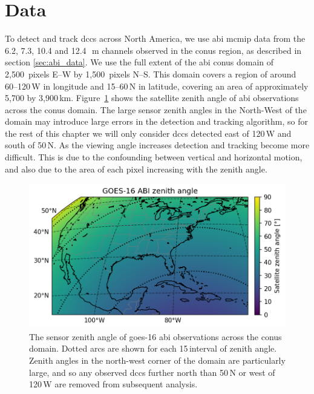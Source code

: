 \section{Data}

To detect and track \acrshort{dcc}s across North America, we use \acrshort{abi} \acrshort{mcmip} data from the 6.2, 7.3, 10.4 and 12.4\,\unit{\mu m} channels observed in the \acrshort{conus} region, as described in section \ref{sec:abi_data}.
We use the full extent of the \acrshort{abi} \acrshort{conus} domain of 2,500~pixels E--W by 1,500~pixels N--S.
This domain covers a region of around 60--120\,\textdegree W in longitude and 15--60\,\textdegree N in latitude, covering an area of approximately 5,700 by 3,900\,\unit{km}.
Figure~\ref{fig:abi_zenith_angles} shows the satellite zenith angle of \acrshort{abi} observations across the \acrshort{conus} domain.
The large sensor zenith angles in the North-West of the domain may introduce large errors in the detection and tracking algorithm, so for the rest of this chapter we will only consider \acrshort{dcc}s detected east of 120\,\textdegree W and south of 50\,\textdegree N.
As the viewing angle increases detection and tracking become more difficult.
This is due to the confounding between vertical and horizontal motion, and also due to the area of each pixel increasing with the zenith angle.

\begin{figure}[tp]
    \centering
    \includegraphics[width=\textwidth]{figures/ch2_01.png}
    \caption[
    The sensor zenith angle of \acrshort{goes}-16 \acrshort{abi} observations across the \acrshort{conus} domain
    ]{
    The sensor zenith angle of \acrshort{goes}-16 \acrshort{abi} observations across the \acrshort{conus} domain. Dotted arcs are shown for each 15\,\textdegree interval of zenith angle. Zenith angles in the north-west corner of the domain are particularly large, and so any observed \acrshort{dcc}s further north than 50\,\textdegree N or west of 120\,\textdegree W are removed from subsequent analysis.
    }
    \label{fig:abi_zenith_angles}
\end{figure}

